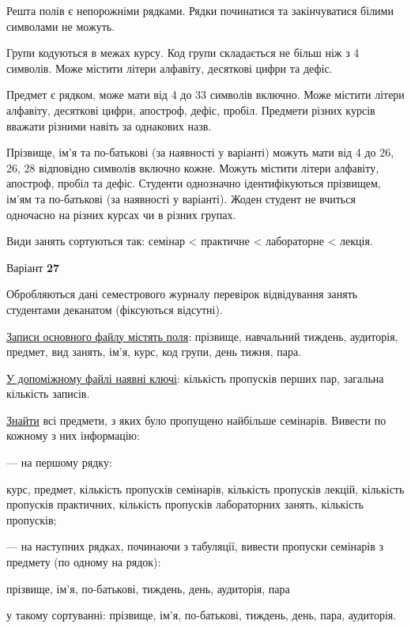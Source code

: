 \documentclass[11pt, ukrainian]{article}
\begin{document}
Решта полів є непорожніми рядками.
Рядки починатися та закінчуватися білими символами не можуть.

Групи кодуються в межах курсу.
Код групи складається не більш ніж з 4 символів.
Може містити літери алфавіту, десяткові цифри та дефіс.

Предмет є рядком, може мати від 4 до 33 символів включно.
Може містити літери алфавіту, десяткові цифри, апостроф, дефіс, пробіл.
Предмети різних курсів вважати різними навіть за однакових назв.

Прізвище, ім’я та по-батькові (за наявності у варіанті)
можуть мати від 4 до 26, 26, 28 відповідно символів включно кожне.
Можуть містити літери алфавіту, апостроф, пробіл та дефіс.
Студенти однозначно ідентифікуються прізвищем, ім’ям та по-батькові (за наявності у варіанті).
Жоден студент не вчиться одночасно на різних курсах чи в різних групах.

Види занять сортуються так: семінар < практичне < лабораторне < лекція.



\par
\newpage
{\center Варіант  \No \textbf { 27 }\par}
\bigskip
Обробляються дані семестрового журналу перевірок відвідування занять студентами деканатом (фіксуються відсутні). 

\underline{Записи основного файлу містять поля}: прізвище, навчальний тиждень, аудиторія, предмет, вид занять, ім’я, курс, код групи, день тижня, пара.

\underline{У допоміжному файлі наявні ключі}: кількість пропусків перших пар, загальна кількість записів.

\underline{Знайти} всі предмети, з яких було пропущено найбільше семінарів. Вивести по кожному з них інформацію:\par
{\noindent}--- на першому рядку:\par
курс, предмет, кількість пропусків семінарів, кількість пропусків лекцій, кількість пропусків практичних, кількість пропусків лабораторних занять, кількість пропусків;

{\noindent}--- на наступних рядках, починаючи з табуляції, вивести пропуски семінарів з предмету (по одному на рядок):\par
прізвище, ім’я, по-батькові, тиждень, день, аудиторія, пара

{\noindent}у такому сортуванні: прізвище, ім’я, по-батькові, тиждень, день, пара, аудиторія.
\end{document}
